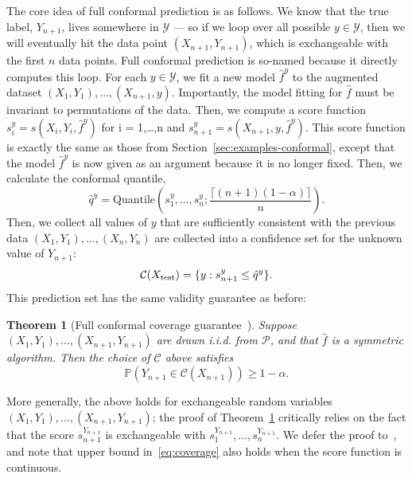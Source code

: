 \documentclass[10pt]{article}
\newtheorem{theorem}{Theorem}
\newcommand{\Y}{\mathcal{Y}}
\newcommand{\C}{\mathcal{C}}
\renewcommand{\P}{\mathbb{P}}
\newcommand{\quantile}{\mathrm{Quantile}}
\begin{document}
The core idea of full conformal prediction is as follows.
We know that the true label, $Y_{n+1}$, lives somewhere in $\Y$ --- so if we loop over all possible $y \in \Y$, then we will eventually hit the data point $(X_{n+1},Y_{n+1})$, which is exchangeable with the first $n$ data points.
Full conformal prediction is so-named because it directly computes this loop.
For each $y \in \mathcal{Y}$, we fit a new model $\hat{f}^y$ to the augmented dataset $(X_1,Y_1), \ldots, (X_{n+1},y)$.
Importantly, the model fitting for $\hat{f}$ must be invariant to permutations of the data.
Then, we compute a score function $s_i^y = s(X_i, Y_i, \hat{f}^y)$ for i = 1,\dots,n and $s_{n+1}^y = s(X_{n+1}, y, \hat{f}^y)$.  
This score function is exactly the same as those from Section~\ref{sec:examples-conformal}, except that the model $\hat{f}^y$ is now given as an argument because it is no longer fixed.
Then, we calculate the conformal quantile,
\begin{equation}
    \hat{q}^y = \quantile\left( s_1^y, \ldots, s_n^y; \frac{\lceil (n+1)(1-\alpha) \rceil}{n} \right).
\end{equation}
Then, we collect all values of $y$ that are sufficiently consistent with the previous data $(X_1, Y_1), \dots, (X_{n}, Y_{n})$ are collected into a confidence set for the unknown value of $Y_{n+1}$:
\begin{equation}
    \label{eq:full-conformal-set}
    \C(X_{\rm test}) = \{ y : s^y_{n+1} \leq \hat{q}^y \}.
\end{equation}
This prediction set has the same validity guarantee as before:
\begin{theorem}[Full conformal coverage guarantee~\cite{vovk2005algorithmic}]
    \label{thm:full-conformal}
    Suppose $(X_1,Y_1),...,(X_{n+1},Y_{n+1})$ are drawn i.i.d. from $\mathcal{P}$, and that $\hat{f}$ is a symmetric algorithm.
    Then the choice of $\C$ above satisfies
    \begin{equation}
        \P\left( Y_{n + 1} \in \C(X_{n + 1}) \right) \geq 1-\alpha.
    \end{equation}
\end{theorem}
More generally, the above holds for exchangeable random variables $(X_1,Y_1),...,(X_{n+1},Y_{n+1})$; the proof of Theorem~\ref{thm:full-conformal} critically relies on the fact that the score $s_{n+1}^{Y_{n+1}}$ is exchangeable with $s_1^{Y_{n+1}}, \ldots, s_n^{Y_{n+1}}$. We defer the proof to~\cite{vovk2005algorithmic}, and note that upper bound in~\eqref{eq:coverage} also holds when the score function is continuous.
\end{document}
